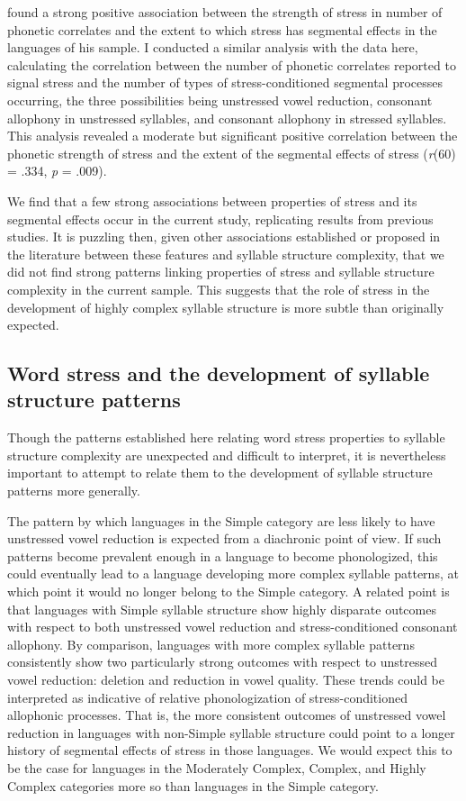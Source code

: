   \citet{Schiering2007} found a strong positive association between the strength of stress in number of phonetic correlates and the extent to which stress has segmental effects in the languages of his sample. I conducted a similar analysis with the data here, calculating the correlation between the number of phonetic correlates reported to signal stress and the number of types of stress-conditioned segmental processes occurring, the three possibilities being unstressed vowel reduction, consonant allophony in unstressed syllables, and consonant allophony in stressed syllables. This analysis revealed a moderate but significant positive correlation between the phonetic strength of stress and the extent of the segmental effects of stress (\textit{r}(60) = .334, \textit{p} = .009).

  We find that a few strong associations between properties of stress and its segmental effects occur in the current study, replicating results from previous studies. It is puzzling then, given other associations established or proposed in the literature between these features and syllable structure complexity, that we did not find strong patterns linking properties of stress and syllable structure complexity in the current sample. This suggests that the role of stress in the development of highly complex syllable structure is more subtle than originally expected.

\subsection{Word stress and the development of syllable structure patterns}\label{sec:5.5.2}

  Though the patterns established here relating word stress properties to syllable structure complexity are unexpected and difficult to interpret, it is nevertheless important to attempt to relate them to the development of syllable structure patterns more generally.

  The pattern by which languages in the Simple category are less likely to have unstressed vowel reduction is expected from a diachronic point of view. If such patterns become prevalent enough in a language to become phonologized, this could eventually lead to a language developing more complex syllable patterns, at which point it would no longer belong to the Simple category. A related point is that languages with Simple syllable structure show highly disparate outcomes with respect to both unstressed vowel reduction and stress-conditioned consonant allophony. By comparison, languages with more complex syllable patterns consistently show two particularly strong outcomes with respect to unstressed vowel reduction: deletion and reduction in vowel quality. These trends could be interpreted as indicative of relative phonologization of stress-conditioned allophonic processes. That is, the more consistent outcomes of unstressed vowel reduction in languages with non-Simple syllable structure could point to a longer history of segmental effects of stress in those languages. We would expect this to be the case for languages in the Moderately Complex, Complex, and Highly Complex categories more so than languages in the Simple category. 

